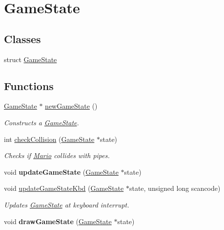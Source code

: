 \hypertarget{group__GameState}{}\section{Game\+State}
\label{group__GameState}
\subsection*{Classes}
\begin{DoxyCompactItemize}
\item 
struct \hyperlink{structGameState}{Game\+State}
\end{DoxyCompactItemize}
\subsection*{Functions}
\begin{DoxyCompactItemize}
\item 
\hyperlink{structGameState}{Game\+State} $\ast$ \hyperlink{group__GameState_ga2d35723c842bd85a0d7f270f549a377c}{new\+Game\+State} ()
\begin{DoxyCompactList}\small\item\em Constructs a \hyperlink{structGameState}{Game\+State}. \end{DoxyCompactList}\item 
int \hyperlink{group__GameState_gaea0343fd6d23e452a026f4ed0453307d}{check\+Collision} (\hyperlink{structGameState}{Game\+State} $\ast$state)
\begin{DoxyCompactList}\small\item\em Checks if \hyperlink{structMario}{Mario} collides with pipes. \end{DoxyCompactList}\item 
void {\bfseries update\+Game\+State} (\hyperlink{structGameState}{Game\+State} $\ast$state)\hypertarget{group__GameState_gadc42f4e0ed57559aa9e3750bc6bca90b}{}\label{group__GameState_gadc42f4e0ed57559aa9e3750bc6bca90b}

\item 
void \hyperlink{group__GameState_ga4e3e427d794bafe2e813da177c4b4801}{update\+Game\+State\+Kbd} (\hyperlink{structGameState}{Game\+State} $\ast$state, unsigned long scancode)
\begin{DoxyCompactList}\small\item\em Updates \hyperlink{structGameState}{Game\+State} at keyboard interrupt. \end{DoxyCompactList}\item 
void {\bfseries draw\+Game\+State} (\hyperlink{structGameState}{Game\+State} $\ast$state)\hypertarget{group__GameState_ga2fdfe5b9baa5720b6ecf554b02484458}{}\label{group__GameState_ga2fdfe5b9baa5720b6ecf554b02484458}


\end{DoxyCompactItemize}
